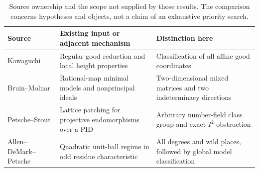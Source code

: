 \begin{table}[tb]
\centering
\caption{Source ownership and the scope not supplied by those results.
The comparison concerns hypotheses and objects, not a claim of an
exhaustive priority search.}
\label{tab:ownership}
\small
\begin{tabular}{@{}p{}p{}p{}@{}}
\toprule
Source & Existing input or adjacent mechanism & Distinction here\\
\midrule
Kawaguchi \cite{Kawaguchi2013} & Regular good reduction and local height
properties & Classification of all affine good coordinates\\
Bruin--Molnar \cite{BruinMolnar2012} & Rational-map minimal models and
nonprincipal ideals & Two-dimensional mixed matrices and two
indeterminacy directions\\
Petsche--Stout \cite{PetscheStout2014} & Lattice patching for projective
endomorphisms over a PID & Arbitrary number-field class group and exact
$I^2$ obstruction\\
Allen--DeMark--Petsche \cite{AllenDeMarkPetsche2018} & Quadratic
unit-ball regime in odd residue characteristic & All degrees and wild
places, followed by global model classification\\
\bottomrule
\end{tabular}
\end{table}
